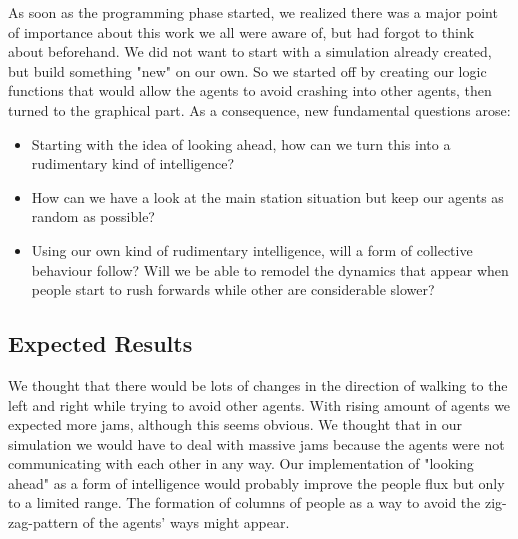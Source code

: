 \newpage
\noi As soon as the programming phase started, we realized there was a major point of importance about this work we all were aware of, but had forgot to think about beforehand. We did not want to start with a simulation already created, but build something "new" on our own. So we started off by creating our logic functions that would allow the agents to avoid crashing into other agents, then turned to the graphical part. As a consequence, new fundamental questions arose:
\begin{itemize}
\item Starting with the idea of looking ahead, how can we turn this into a rudimentary kind of intelligence?
\item How can we have a look at the main station situation but keep our agents as random as possible?
\item Using our own kind of rudimentary intelligence, will a form of collective behaviour follow? Will we be able to remodel the dynamics that appear when people start to rush forwards while other are considerable slower?
\end{itemize}

\subsection{Expected Results}
We thought that there would be lots of changes in the direction of walking to the left and right while trying to avoid other agents. With rising amount of agents we expected more jams, although this seems obvious. We thought that in our simulation we would have to deal with massive jams because the agents were not communicating with each other in any way. Our implementation of "looking ahead" as a form of intelligence would probably improve the people flux but only to a limited range. The formation of columns of people as a way to avoid the zig-zag-pattern of the agents' ways might appear.
